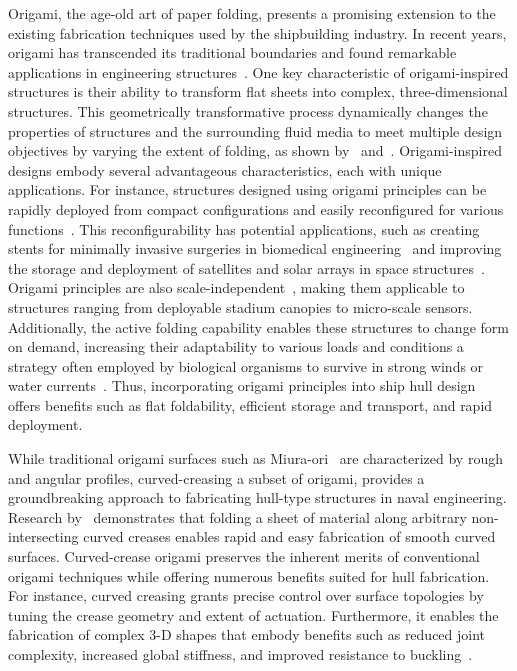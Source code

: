 Origami, the age-old art of paper folding, presents a promising extension to the existing fabrication techniques used by the shipbuilding industry. In recent years, origami has transcended its traditional boundaries and found remarkable applications in engineering structures~\cite{meloni_engineering_2021}. One key characteristic of origami-inspired structures is their ability to transform flat sheets into complex, three-dimensional structures. This geometrically transformative process dynamically changes the properties of structures and the surrounding fluid media to meet multiple design objectives by varying the extent of folding, as shown by~\cite{chen_drag_2023} and~\cite{origami_flexiball_2023}. Origami-inspired designs embody several advantageous characteristics, each with unique applications. For instance, structures designed using origami principles can be rapidly deployed from compact configurations and easily reconfigured for various functions~\cite{zirbel_hanaflex_2015}. This reconfigurability has potential applications, such as creating stents for minimally invasive surgeries in biomedical engineering~\cite{kuribayashi_stent_2006} and improving the storage and deployment of satellites and solar arrays in space structures~\cite{bowen_starshade_2016}. Origami principles are also scale-independent~\cite{dudte_scale_2016}, making them applicable to structures ranging from deployable stadium canopies to micro-scale sensors. Additionally, the active folding capability enables these structures to change form on demand, increasing their adaptability to various loads and conditions \textemdash{} a strategy often employed by biological organisms to survive in strong winds or water currents~\cite{harder_reconfiguration_2004}. Thus, incorporating origami principles into ship hull design offers benefits such as flat foldability, efficient storage and transport, and rapid deployment.

While traditional origami surfaces such as Miura-ori~\cite{k_science_2008} are characterized by rough and angular profiles, curved-creasing \textemdash{} a subset of origami, provides a groundbreaking approach to fabricating hull-type structures in naval engineering. Research by~\cite{erik_demaine_curved_2011} demonstrates that folding a sheet of material along arbitrary non-intersecting curved creases enables rapid and easy fabrication of smooth curved surfaces. Curved-crease origami preserves the inherent merits of conventional origami techniques while offering numerous benefits suited for hull fabrication. For instance, curved creasing grants precise control over surface topologies by tuning the crease geometry and extent of actuation. Furthermore, it enables the fabrication of complex 3-D shapes that embody benefits such as reduced joint complexity, increased global stiffness, and improved resistance to buckling~\cite{woodruff2021curved}.

